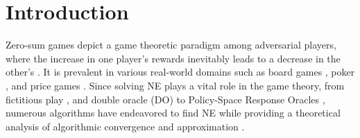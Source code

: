 \section{Introduction}





Zero-sum games depict a game theoretic paradigm among adversarial players, where the increase in one player's rewards inevitably leads to a decrease in the other's \citep{lipton1994simple}. It is prevalent in various real-world domains such as board games \citep{ghory2004reinforcement}, poker \citep{zinkevich2007regret}, and price games \citep{kakkar2022blockchain}. Since solving NE plays a vital role in the game theory, from fictitious play \citep{brown1951iterative}, and double oracle (DO) \citep{mcmahan2003planning} to Policy-Space Response Oracles \citep{lanctot2017unified}, numerous algorithms have endeavored to find NE while providing a theoretical analysis of algorithmic convergence and approximation \citep{jafari2001no, waugh2015unified, balandat2016minimizing, dinh2022online, tang2023regret}. 

